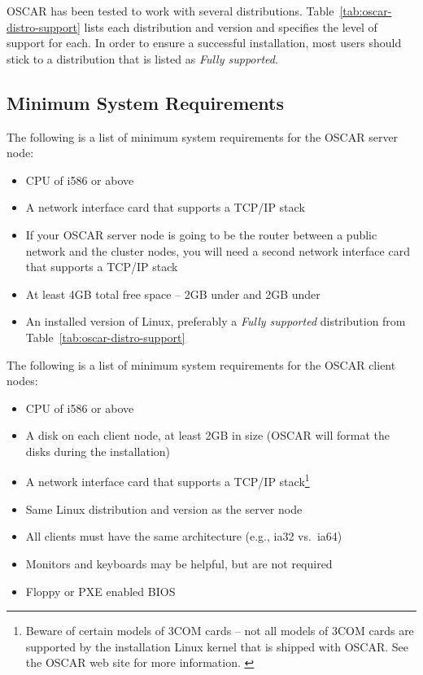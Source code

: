 OSCAR has been tested to work with several distributions.
Table~\ref{tab:oscar-distro-support} lists each distribution and
version and specifies the level of support for each. In order to
ensure a successful installation, most users should stick to a
distribution that is listed as \emph{Fully supported}.




\subsection{Minimum System Requirements}
\label{sec:intro-min-sys}


The following is a list of minimum system requirements for the OSCAR
server node:

\begin{itemize}
\item CPU of i586 or above
\item A network interface card that supports a TCP/IP stack
\item If your OSCAR server node is going to be the router between a
  public network and the cluster nodes, you will need a second
  network interface card that supports a TCP/IP stack
\item At least 4GB total free space -- 2GB under \file{/} and 2GB
  under 
\item An installed version of Linux, preferably a {\em Fully
    supported} distribution from Table~\ref{tab:oscar-distro-support}
\end{itemize}

\noindent The following is a list of minimum system requirements for
the OSCAR client nodes:

\begin{itemize}
\item CPU of i586 or above
\item A disk on each client node, at least 2GB in size (OSCAR will
  format the disks during the installation)
\item A network interface card that supports a TCP/IP
  stack\footnote{Beware of certain models of 3COM cards -- not all
    models of 3COM cards are supported by the installation Linux
    kernel that is shipped with OSCAR.  See the OSCAR web site for
    more information. \label{foot:3com-warning}}
\item Same Linux distribution and version as the server node
\item All clients must have the same architecture (e.g., ia32 vs.\
  ia64)
\item Monitors and keyboards may be helpful, but are not required
\item Floppy or PXE enabled BIOS
\end{itemize}


